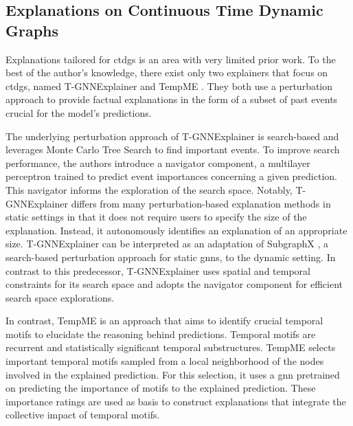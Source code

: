 \subsection{Explanations on Continuous Time Dynamic Graphs}
\label{s_relatedWork_CTDG}

Explanations tailored for \glspl{ctdg} is an area with very limited prior work. To the best of the author's knowledge, there exist only two explainers that focus on \glspl{ctdg}, named T-GNNExplainer \cite{xia_explaining_2023} and TempME \cite{chen_tempme_2023}. They both use a perturbation approach to provide factual explanations in the form of a subset of past events crucial for the model's predictions.

The underlying perturbation approach of T-GNNExplainer is search-based and leverages Monte Carlo Tree Search to find important events. To improve search performance, the authors introduce a navigator component, a multilayer perceptron trained to predict event importances concerning a given prediction. This navigator informs the exploration of the search space. Notably, T-GNNExplainer differs from many perturbation-based explanation methods in static settings in that it does not require users to specify the size of the explanation. Instead, it autonomously identifies an explanation of an appropriate size. T-GNNExplainer can be interpreted as an adaptation of SubgraphX \cite{yuan_explainability_2021}, a search-based perturbation approach for static \glspl{gnn}, to the dynamic setting. In contrast to this predecessor, T-GNNExplainer uses spatial and temporal constraints for its search space and adopts the navigator component for efficient search space explorations.

In contrast, TempME is an approach that aims to identify crucial temporal motifs to elucidate the reasoning behind predictions. Temporal motifs are recurrent and statistically significant temporal substructures. TempME selects important temporal motifs sampled from a local neighborhood of the nodes involved in the explained prediction. For this selection, it uses a \gls{gnn} pretrained on predicting the importance of motifs to the explained prediction. These importance ratings are used as basis to construct explanations that integrate the collective impact of temporal motifs.




